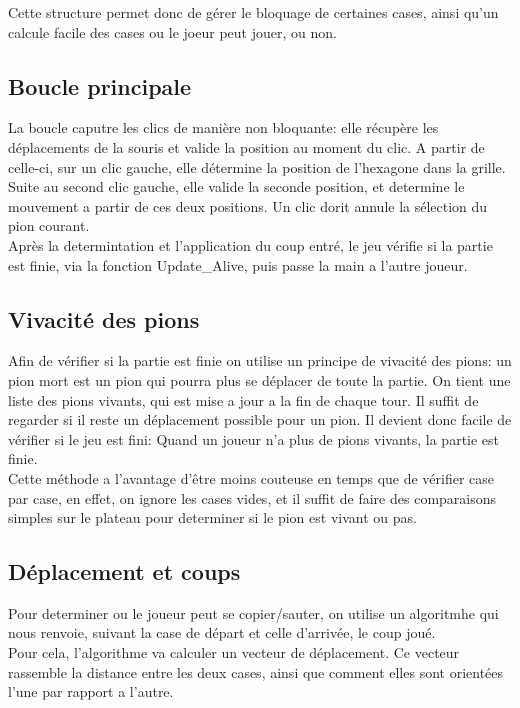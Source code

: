 \documentclass{report}
\begin{document}
		Cette structure permet donc de gérer le bloquage de certaines cases, ainsi qu'un calcule facile des cases ou le joeur peut jouer, ou non. 

	\subsection {Boucle principale}
		
	La boucle caputre les clics de manière non bloquante: elle récupère les déplacements de la souris et valide la position au moment du clic. A partir de celle-ci, sur un clic gauche, elle détermine la position de l'hexagone dans la grille. Suite au second clic gauche, elle valide la seconde position, et determine le mouvement a partir de ces deux positions. Un clic dorit annule la sélection du pion courant.\\

Après la determintation et l'application du coup entré, le jeu vérifie si la partie est finie, via la fonction Update\_Alive, puis passe la main a l'autre joueur. 
	\subsection{Vivacité des pions}

Afin de vérifier si la partie est finie on utilise un principe de vivacité des pions: un pion mort est un pion qui pourra plus se déplacer de toute la partie. On tient une liste des pions vivants, qui est mise a jour a la fin de chaque tour. Il suffit de regarder si il reste un déplacement possible pour un pion. Il devient donc facile de vérifier si le jeu est fini: Quand un joueur n'a plus de pions vivants, la partie est finie.\\

Cette méthode a l'avantage d'être moins couteuse en temps que de vérifier case par case, en effet, on ignore les cases vides, et il suffit de faire des comparaisons simples sur le plateau pour determiner si le pion est vivant ou pas.

	\subsection{Déplacement et coups}
	Pour determiner ou le joueur peut se copier/sauter, on utilise un algoritmhe qui nous renvoie, suivant la case de départ et celle d'arrivée, le coup joué.\\
	
	Pour cela, l'algorithme va calculer un vecteur de déplacement. Ce vecteur rassemble la distance entre les deux cases, ainsi que comment elles sont orientées l'une par rapport a l'autre.\\
	
\end{document}
